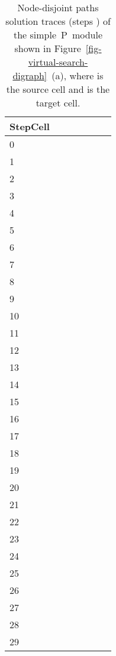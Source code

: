 \documentclass[preliminary,copyright,creativecommons]{eptcs}
\newcommand{\myway}[1]{\raisebox{-4pt}{\rule{0pt}{16pt}}\colorbox[rgb]{.7,.7,.7}{#1}}
\theoremstyle{remark}
\begin{document}
\begin{table}[h]
\caption{Node-disjoint paths solution traces (steps ) of the 
simple~P~module shown in Figure~\ref{fig-virtual-search-digraph}~(a),
where  is the source cell and  is the target cell.}
\label{tab-trace-node}
\begin{center}
\renewcommand{\tabcolsep}{3.0pt}
\renewcommand{\arraystretch}{1.3}
\footnotesize
\noindent
\begin{tabular}{ | l | l | l | l | l | l | l | }
\hline
StepCell
 &  &  &  &  &  &  \\ \hline
0 &  &  &  &  &  &  \\ \hline
1 &  &  &  &  &  &  \\ \hline
2 &  &  &  &  &  &  \\ \hline
3 &  &  &  &  &  &  \\ \hline
4 & \myway{} &  &  &  &  &  \\ \hline
5 &  & \myway{} &  & \myway{} &  &  \\ \hline
6 &  &  & \myway{} &  & \myway{} &  \\ \hline
7 &  &  &  &  &  & \myway{} \\ \hline
8 &  &  &  &  &  &  \\ \hline
9 &  &  &  &  &  &  \\ \hline
10 &  &  &  &  &  &  \\ \hline
11 &  &  &  &  &  &  \\ \hline
12 &  &  &  &  &  &  \\ \hline
13 &  &  &  &  &  &  \\ \hline
14 &  &  &  &  &  &  \\ \hline
15 &  &  &  &  &  &  \\ \hline
16 &  &  &  &  &  &  \\ \hline
17 &  &  &  &  &  &  \\ \hline
18 &  &  &  &  &  &  \\ \hline
19 &  &  &  &  &  &  \\ \hline
20 &  &  &  &  &  &  \\ \hline
21 &  &  &  &  &  &  \\ \hline
22 &  &  &  &  &  & \myway{} \\ \hline
23 &  &  & \myway{} &  &  &  \\ \hline
24 &  &  &  & \myway{} &  &  \\ \hline
25 & \myway{} &  &  &  &  &  \\ \hline
26 &  &  &  &  &  &  \\ \hline
27 &  &  &  &  &  &  \\ \hline
28 &  &  &  &  &  &  \\ \hline
29 &  &  &  &  &  &  \\ \hline
\end{tabular}
\end{center}
\end{table}
\end{document}
